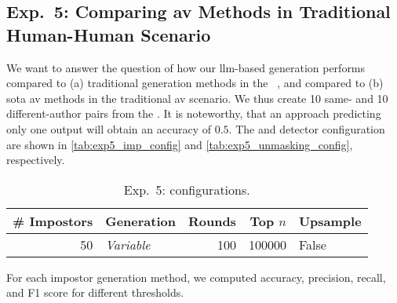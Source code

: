 \subsection{Exp.\ 5: Comparing \acs{av} Methods in Traditional Human-Human Scenario}
\label{subsec:imp_gen}

We want to answer the question of how our \ac{llm}-based \imp{} generation performs compared to (a) traditional \imp{} generation methods in the \impAppr{}~\citep{koppel_determining_2014}, and compared to (b) \acl{sota} \ac{av} methods in the traditional \ac{av} scenario.
We thus create 10 same- and 10 different-author pairs from the \dataStudent{}. %
It is noteworthy, that an approach predicting only one output will obtain an accuracy of $0.5$.
The \impAppr{} and \unmasking{} detector configuration are shown in \autoref{tab:exp5_imp_config} and \autoref{tab:exp5_unmasking_config}, respectively.

\begin{table}[h]
\centering\small
\caption{Exp.\ 5: \impAppr{} configurations.}
\label{tab:exp5_imp_config}
\begin{tabular}{@{}rlrrl@{}}   %
\toprule
\# Impostors & Generation & Rounds & Top $n$ & Upsample \\
\midrule
50 & \textit{Variable} & 100 & \num{100000} & False \\
\bottomrule
\end{tabular}%
\end{table}


For each impostor generation method, we computed accuracy, precision, recall, and F1 score for different thresholds. 
